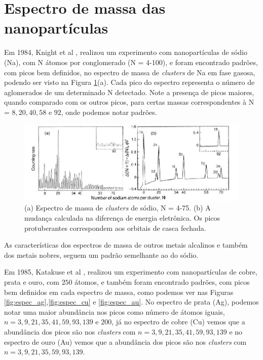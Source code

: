 \section{Espectro de massa das nanopartículas}

Em 1984, Knight et al \cite{electronic_Shell_sodium}, realizou um experimento com nanopartículas de sódio (Na), com N átomos por conglomerado (N = 4-100), e foram encontrado padrões, com picos bem definidos, no espectro de massa de \textit{clusters} de Na em fase gasosa, podendo ser visto na Figura \ref{fig:espec_na}(a). Cada pico do espectro representa o número de 
aglomerados de um determinado N detectado. Note a presença de picos maiores, quando comparado com os outros picos, para certas massas correspondentes à N = $8, 20, 40, 58$ e $92$, onde podemos notar padrões. 




\begin{figure}
  \centering
  \includegraphics[width=1\textwidth]{images/clusters/NA_knight}
  \caption{(a) Espectro de massa de \textit{clusters} de sódio, N = 4-75.
  (b) A mudança calculada na diferença de energia eletrônica. Os picos protuberantes correspondem aos orbitais de casca fechada.\cite{electronic_Shell_sodium}  }
  \label{fig:espec_na}
\end{figure}


As características dos espectros de massa de outros metais alcalinos e também dos metais nobres, seguem um padrão semelhante ao do sódio.

Em 1985, Katakuse et al \cite{KATAKUSE1985229}, realizou um experimento com nanopartículas de cobre, prata e ouro, com $250$ átomos, e também foram encontrado padrões, com picos bem definidos em cada espectro de massa, como podemos ver nas Figuras \ref{fig:espec_ag},\ref{fig:espec_cu} e \ref{fig:espec_au}. No espectro de prata (Ag), podemos notar uma maior abundância nos picos como número de átomos iguais, $n= 3,9,21,35,41,59,93,139$ e $200$, já no espectro de cobre (Cu) vemos que a abundância dos picos são nos \textit{clusters} com $n= 3,9,21,35,41,59,93,139$ e no espectro de ouro (Au) vemos que a abundância dos picos são nos \textit{clusters} com $n= 3,9,21,35,59,93,139$.






